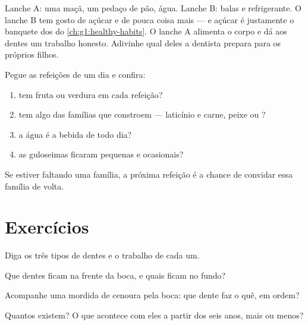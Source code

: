 \begin{example}\label{ex:g2:teeth-and-eating-well:snack}
Lanche A: uma maçã, um pedaço de pão, água. Lanche B: balas e
refrigerante. O lanche B tem gosto de açúcar e de pouca coisa mais
--- e açúcar é justamente o banquete dos  do
\cref{ch:g1:healthy-habits}. O lanche A alimenta o corpo e dá aos
dentes um trabalho honesto. Adivinhe qual deles a dentista prepara
para os próprios filhos.
\end{example}

\begin{method}\label{met:g2:teeth-and-eating-well:check}
Pegue as refeições de um dia e confira:
\begin{enumerate}
  \item tem fruta ou verdura em cada refeição?
  \item tem algo das famílias que constroem --- laticínio e carne,
        peixe ou ?
  \item a água é a bebida de todo dia?
  \item as guloseimas ficaram pequenas e ocasionais?
\end{enumerate}
Se estiver faltando uma família, a próxima refeição é a chance de
convidar essa família de volta.
\end{method}

\section{Exercícios}

\begin{exercise}[$\star$]\label{exo:g2:teeth-and-eating-well:1}
Diga os três tipos de dentes e o trabalho de cada um.
\end{exercise}

\begin{exercise}[$\star$]\label{exo:g2:teeth-and-eating-well:2}
Que dentes ficam na frente da boca, e quais ficam no fundo?
\end{exercise}

\begin{exercise}[$\star$]\label{exo:g2:teeth-and-eating-well:3}
Acompanhe uma mordida de cenoura pela boca: que dente faz o quê, em
ordem?
\end{exercise}

\begin{exercise}[$\star$]\label{exo:g2:teeth-and-eating-well:4}
Quantos  existem? O que acontece com eles a partir
dos seis anos, mais ou menos?
\end{exercise}


